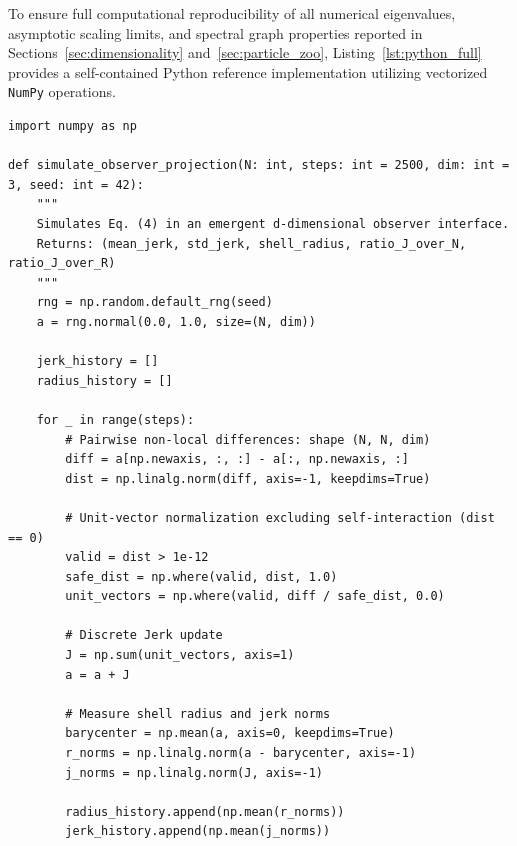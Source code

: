 \documentclass[11pt,a4paper]{article}
\theoremstyle{plain}
\theoremstyle{definition}
\theoremstyle{remark}
\begin{document}
To ensure full computational reproducibility of all numerical eigenvalues, asymptotic scaling limits, and spectral graph properties reported in Sections~\ref{sec:dimensionality} and~\ref{sec:particle_zoo}, Listing~\ref{lst:python_full} provides a self-contained Python reference implementation utilizing vectorized \texttt{NumPy} operations.


\begin{lstlisting}[language=PythonRJD, backgroundcolor=\color{pybg}, caption={Complete Python simulation suite verifying the $2/3$ projection law, Platonic eigenvalues ($\sqrt{3}, \sqrt{6}$), and coordinate-free graph Laplacians.},label={lst:python_full}]
import numpy as np

def simulate_observer_projection(N: int, steps: int = 2500, dim: int = 3, seed: int = 42):
    """
    Simulates Eq. (4) in an emergent d-dimensional observer interface.
    Returns: (mean_jerk, std_jerk, shell_radius, ratio_J_over_N, ratio_J_over_R)
    """
    rng = np.random.default_rng(seed)
    a = rng.normal(0.0, 1.0, size=(N, dim))
    
    jerk_history = []
    radius_history = []
    
    for _ in range(steps):
        # Pairwise non-local differences: shape (N, N, dim)
        diff = a[np.newaxis, :, :] - a[:, np.newaxis, :]
        dist = np.linalg.norm(diff, axis=-1, keepdims=True)
        
        # Unit-vector normalization excluding self-interaction (dist == 0)
        valid = dist > 1e-12
        safe_dist = np.where(valid, dist, 1.0)
        unit_vectors = np.where(valid, diff / safe_dist, 0.0)
        
        # Discrete Jerk update
        J = np.sum(unit_vectors, axis=1)
        a = a + J
        
        # Measure shell radius and jerk norms
        barycenter = np.mean(a, axis=0, keepdims=True)
        r_norms = np.linalg.norm(a - barycenter, axis=-1)
        j_norms = np.linalg.norm(J, axis=-1)
        
        radius_history.append(np.mean(r_norms))
        jerk_history.append(np.mean(j_norms))
        

\end{lstlisting}
\end{document}
